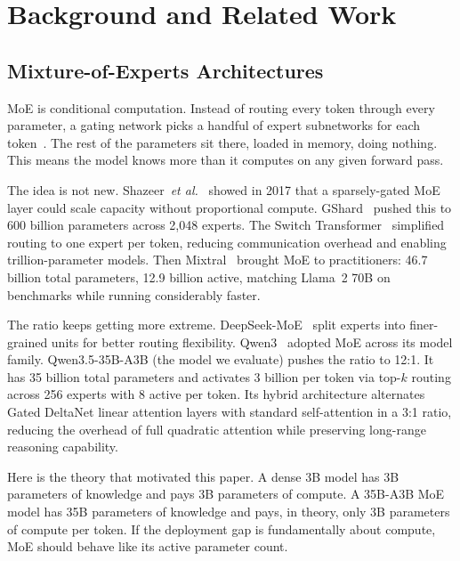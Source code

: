 \documentclass[11pt]{article}
\newcommand{\etal}{\textit{et al.}}
\begin{document}
\section{Background and Related Work}
\label{sec:background}

\subsection{Mixture-of-Experts Architectures}
\label{sec:moe-architectures}

MoE is conditional computation.  Instead of routing every token through every parameter, a gating network picks a handful of expert subnetworks for each token~\citep{shazeer2017outrageously}.  The rest of the parameters sit there, loaded in memory, doing nothing.  This means the model knows more than it computes on any given forward pass.

The idea is not new.  Shazeer~\etal~\citep{shazeer2017outrageously} showed in 2017 that a sparsely-gated MoE layer could scale capacity without proportional compute.  GShard~\citep{lepikhin2020gshard} pushed this to 600 billion parameters across 2,048 experts.  The Switch Transformer~\citep{fedus2022switch} simplified routing to one expert per token, reducing communication overhead and enabling trillion-parameter models.  Then Mixtral~\citep{jiang2024mixtral} brought MoE to practitioners: 46.7 billion total parameters, 12.9 billion active, matching Llama~2 70B on benchmarks while running considerably faster.

The ratio keeps getting more extreme.  DeepSeek-MoE~\citep{dai2024deepseekmoe} split experts into finer-grained units for better routing flexibility.  Qwen3~\citep{qwen2025qwen3} adopted MoE across its model family.  Qwen3.5-35B-A3B (the model we evaluate) pushes the ratio to 12:1.  It has 35 billion total parameters and activates 3 billion per token via top-$k$ routing across 256 experts with 8 active per token.  Its hybrid architecture alternates Gated DeltaNet linear attention layers with standard self-attention in a 3:1 ratio, reducing the overhead of full quadratic attention while preserving long-range reasoning capability.

Here is the theory that motivated this paper.  A dense 3B model has 3B parameters of knowledge and pays 3B parameters of compute.  A 35B-A3B MoE model has 35B parameters of knowledge and pays, in theory, only 3B parameters of compute per token.  If the deployment gap is fundamentally about compute, MoE should behave like its active parameter count.
\end{document}
